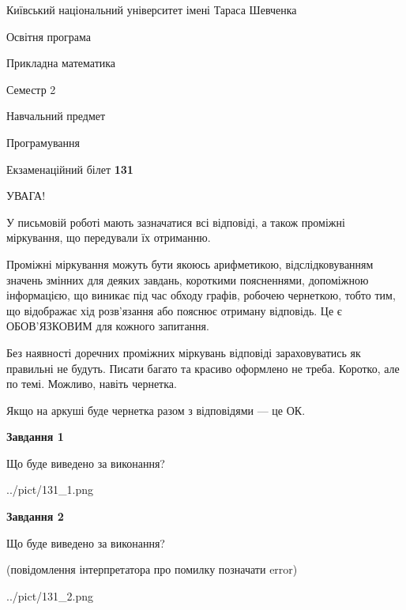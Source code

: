 \documentclass[12pt, ukrainian]{article}
\begin{document}
{{\begin {small}\par
{ \center  Київський національний університет імені Тараса Шевченка \par}
{\parbox {5 cm}{Освітня програма \hfill}{\parbox {7 cm}{Прикладна математика\hfill}}\parbox {6 cm}{\hfill Семестр 2}}\par
{\parbox {5 cm} {Навчальний предмет \hfill}\parbox {7 cm}{Програмування \hfill}\parbox {6cm}{\hfill}\par}\vspace{-7pt} \end{small}}{\center Екзаменаційний білет \No \textbf
{ 131 }\par}}
{
\begin {large}
УВАГА!

У письмовій роботі мають зазначатися всі відповіді, а також проміжні міркування, що передували їх отриманню.

Проміжні міркування можуть бути якоюсь арифметикою, відслідковуванням зна\-чень змінних для деяких завдань,
короткими поясненнями, допоміжною інформацією, що виникає під час обходу графів, робочею чернеткою,
тобто тим, що відображає хід розв’язання або пояснює отриману відповідь.
Це є ОБОВ’ЯЗКОВИМ для кожного запитання.

Без наявності доречних проміжних міркувань відповіді зараховуватись як правиль\-ні не будуть.
Писати багато та красиво оформлено не треба. Коротко, але по темі. Можли\-во, навіть чернетка.

Якщо на аркуші буде чернетка разом з відповідями --- це ОК.

\newpage

{\begin {center}\textbf{Завдання 1}\end {center}}\par
Що буде виведено за виконання?\par
\begin{center}
	{../pict/131_1.png}
\end{center}
\newpage

{\begin {center}\textbf{Завдання 2}\end {center}}\par
Що буде виведено за виконання?\par
 (повідомлення інтерпретатора про помилку позначати error)\par
\begin{center}
	{../pict/131_2.png}
\end{center}
\newpage


\end{large}}
\end{document}

